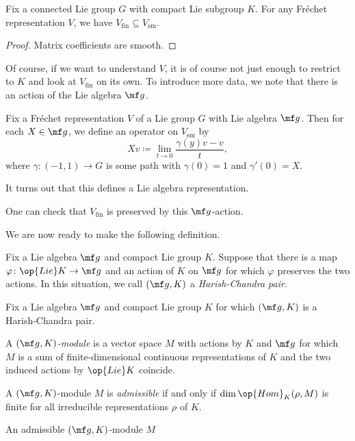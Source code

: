 \documentclass[../notes.tex]{subfiles}
\begin{document}
\begin{lemma}
	Fix a connected Lie group $G$ with compact Lie subgroup $K$. For any Fr\'echet representation $V$, we have $V_{\mathrm{fin}}\subseteq V_{\mathrm{sm}}$.
\end{lemma}
\begin{proof}
	Matrix coefficients are smooth.
\end{proof}
Of course, if we want to understand $V$, it is of course not just enough to restrict to $K$ and look at $V_{\mathrm{fin}}$ on its own. To introduce more data, we note that there is an action of the Lie algebra $\mf g$.
\begin{notation}
	Fix a Fr\'echet representation $V$ of a Lie group $G$ with Lie algebra $\mf g$. Then for each $X\in\mf g$, we define an operator on $V_{\mathrm{sm}}$ by
	\[Xv\coloneqq\lim_{t\to0}\frac{\gamma(y)v-v}t,\]
	where $\gamma\colon(-1,1)\to G$ is some path with $\gamma(0)=1$ and $\gamma'(0)=X$.
\end{notation}
\begin{remark}
	It turns out that this defines a Lie algebra representation.
\end{remark}
\begin{remark}
	One can check that $V_{\mathrm{fin}}$ is preserved by this $\mf g$-action.
\end{remark}
We are now ready to make the following definition.
\begin{definition}
	Fix a Lie algebra $\mf g$ and compact Lie group $K$. Suppose that there is a map $\varphi\colon\op{Lie}K\to\mf g$ and an action of $K$ on $\mf g$ for which $\varphi$ preserves the two actions. In this situation, we call $(\mf g,K)$ a \textit{Harish-Chandra pair}.
\end{definition}
\begin{defihelper}[$(\mf g,K)$-module] 
	Fix a Lie algebra $\mf g$ and compact Lie group $K$ for which $(\mf g,K)$ is a Harish-Chandra pair.
	\begin{listalph}
		\item A \textit{$(\mf g,K)$-module} is a vector space $M$ with actions by $K$ and $\mf g$ for which $M$ is a sum of finite-dimensional continuous representations of $K$ and the two induced actions by $\op{Lie}K$ coincide.
		\item A $(\mf g,K)$-module $M$ is \textit{admissible} if and only if $\dim\op{Hom}_K(\rho,M)$ is finite for all irreducible representations $\rho$ of $K$.
		\item An admissible $(\mf g,K)$-module $M$
	\end{listalph}
\end{defihelper}
\end{document}
